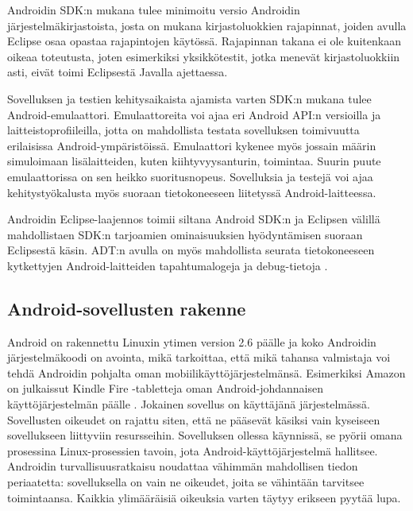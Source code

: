Androidin SDK:n mukana tulee minimoitu versio Androidin järjestelmäkirjastoista, josta on mukana kirjastoluokkien rajapinnat, joiden avulla Eclipse osaa opastaa rajapintojen käytössä. Rajapinnan takana ei ole kuitenkaan oikeaa toteutusta, joten esimerkiksi yksikkötestit, jotka menevät kirjastoluokkiin asti, eivät toimi Eclipsestä Javalla ajettaessa.

Sovelluksen ja testien kehitysaikaista ajamista varten SDK:n mukana tulee Android-emulaattori. Emulaattoreita voi ajaa eri Android API:n versioilla ja laitteistoprofiileilla, jotta on mahdollista testata sovelluksen toimivuutta erilaisissa Android-ympäristöissä. Emulaattori kykenee myös jossain määrin simuloimaan lisälaitteiden, kuten kiihtyvyysanturin, toimintaa. Suurin puute emulaattorissa on sen heikko suoritusnopeus. Sovelluksia ja testejä voi ajaa kehitystyökalusta myös suoraan tietokoneeseen liitetyssä Android-laitteessa. 

Androidin Eclipse-laajennos toimii siltana Android SDK:n ja Eclipsen välillä mahdollistaen SDK:n tarjoamien ominaisuuksien hyödyntämisen suoraan Eclipsestä käsin. ADT:n avulla on myös mahdollista seurata tietokoneeseen kytkettyjen Android-laitteiden tapahtumalogeja ja debug-tietoja \cite[25-50]{androidgamedev}.

\subsection{Android-sovellusten rakenne}

Android on rakennettu Linuxin ytimen version 2.6 päälle ja koko Androidin järjestelmäkoodi on avointa, mikä tarkoittaa, että mikä tahansa valmistaja voi tehdä Androidin pohjalta oman mobiilikäyttöjärjestelmänsä. Esimerkiksi Amazon on julkaissut Kindle Fire -tabletteja oman Android-johdannaisen käyttöjärjestelmän päälle \cite{kindle_fire}. Jokainen sovellus on käyttäjänä järjestelmässä. Sovellusten oikeudet on rajattu siten, että ne pääsevät käsiksi vain kyseiseen sovellukseen liittyviin resursseihin. Sovelluksen ollessa käynnissä, se pyörii omana prosessina Linux-prosessien tavoin, jota Android-käyttöjärjestelmä hallitsee. Androidin turvallisuusratkaisu noudattaa vähimmän mahdollisen tiedon periaatetta: sovelluksella on vain ne oikeudet, joita se vähintään tarvitsee toimintaansa. Kaikkia ylimääräisiä oikeuksia varten täytyy erikseen pyytää lupa.

